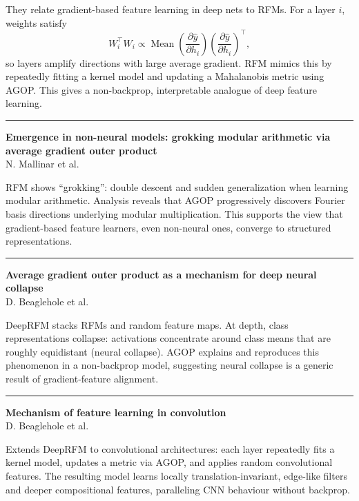 \documentclass[a5paper]{article}
\begin{document}
They relate gradient-based feature learning in deep nets to RFMs. For a
layer $i$, weights satisfy
\[ W_i^\top W_i \propto \operatorname{Mean}
\left(\frac{\partial \hat y}{\partial h_i}\right)\left(\frac{\partial \hat y}{\partial h_i}\right)^\top,
\]
so layers amplify directions with large average gradient. RFM mimics
this by repeatedly fitting a kernel model and updating a Mahalanobis
metric using AGOP. This gives a non-backprop, interpretable analogue of
deep feature learning.

\begin{center}\rule{0.5\linewidth}{0.5pt}\end{center}

\textbf{Emergence in non-neural models: grokking modular arithmetic via
average gradient outer product}\\
N. Mallinar et al.

RFM shows ``grokking'': double descent and sudden generalization when
learning modular arithmetic. Analysis reveals that AGOP progressively
discovers Fourier basis directions underlying modular multiplication.
This supports the view that gradient-based feature learners, even
non-neural ones, converge to structured representations.

\begin{center}\rule{0.5\linewidth}{0.5pt}\end{center}

\textbf{Average gradient outer product as a mechanism for deep neural
collapse}\\
D. Beaglehole et al.

DeepRFM stacks RFMs and random feature maps. At depth, class
representations collapse: activations concentrate around class means
that are roughly equidistant (neural collapse). AGOP explains and
reproduces this phenomenon in a non-backprop model, suggesting neural
collapse is a generic result of gradient-feature alignment.

\begin{center}\rule{0.5\linewidth}{0.5pt}\end{center}

\textbf{Mechanism of feature learning in convolution}\\
D. Beaglehole et al.

Extends DeepRFM to convolutional architectures: each layer repeatedly
fits a kernel model, updates a metric via AGOP, and applies random
convolutional features. The resulting model learns locally
translation-invariant, edge-like filters and deeper compositional
features, paralleling CNN behaviour without backprop.
\end{document}
